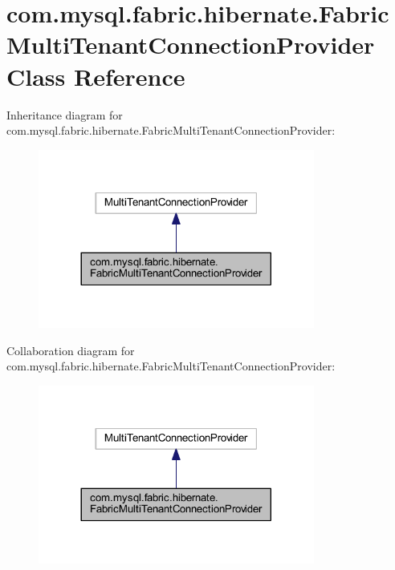 \hypertarget{classcom_1_1mysql_1_1fabric_1_1hibernate_1_1_fabric_multi_tenant_connection_provider}{}\section{com.\+mysql.\+fabric.\+hibernate.\+Fabric\+Multi\+Tenant\+Connection\+Provider Class Reference}
\label{classcom_1_1mysql_1_1fabric_1_1hibernate_1_1_fabric_multi_tenant_connection_provider}


Inheritance diagram for com.\+mysql.\+fabric.\+hibernate.\+Fabric\+Multi\+Tenant\+Connection\+Provider\+:\nopagebreak
\begin{figure}[H]
\begin{center}
\leavevmode
\includegraphics[width=257pt]{classcom_1_1mysql_1_1fabric_1_1hibernate_1_1_fabric_multi_tenant_connection_provider__inherit__graph}
\end{center}
\end{figure}


Collaboration diagram for com.\+mysql.\+fabric.\+hibernate.\+Fabric\+Multi\+Tenant\+Connection\+Provider\+:\nopagebreak
\begin{figure}[H]
\begin{center}
\leavevmode
\includegraphics[width=257pt]{classcom_1_1mysql_1_1fabric_1_1hibernate_1_1_fabric_multi_tenant_connection_provider__coll__graph}
\end{center}
\end{figure}
